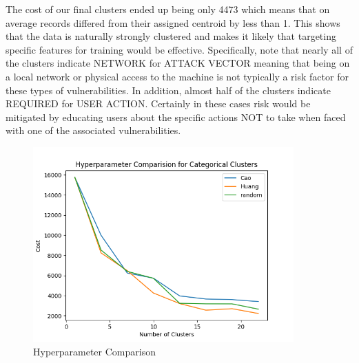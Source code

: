 \documentclass{article} %
\begin{document}
The cost of our final clusters ended up being only 4473 which means that on average records differed from their assigned centroid by less than 1.  This shows that the data is naturally strongly clustered and makes it likely that targeting specific features for training would be effective.  Specifically, note that nearly all of the clusters indicate NETWORK for ATTACK VECTOR meaning that being on a local network or physical access to the machine is not typically a risk factor for these types of vulnerabilities.  In addition, almost half of the clusters indicate REQUIRED for USER ACTION.  Certainly in these cases risk would be mitigated by educating users about the specific actions NOT to take when faced with one of the associated vulnerabilities.

\begin{figure}[h]
  \centering
  \includegraphics[width=10cm]{images/Hyperparameter.png}
  \caption{Hyperparameter Comparison}
  \label{Figure:VulOntology}
\end{figure}
\end{document}
